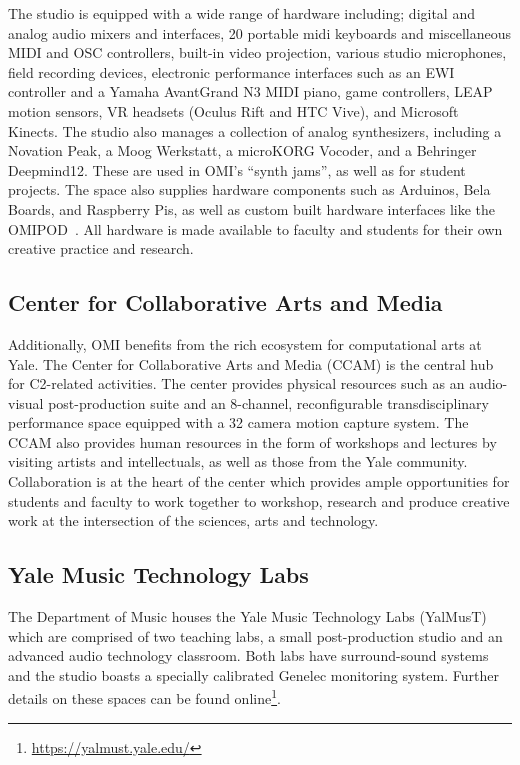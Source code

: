 The studio is equipped with a wide range of hardware including; digital and analog audio mixers and interfaces, 20 portable midi keyboards and miscellaneous MIDI and OSC controllers, built-in video projection, various studio microphones, field recording devices, electronic performance interfaces such as an EWI controller and a Yamaha AvantGrand N3 MIDI piano, game controllers, LEAP motion sensors, VR headsets (Oculus Rift and HTC Vive), and Microsoft Kinects. The studio also manages a collection of analog synthesizers, including a Novation Peak, a Moog Werkstatt, a microKORG Vocoder, and a Behringer Deepmind12. These are used in OMI's ``synth jams'', as well as for student projects. The space also supplies hardware components such as Arduinos, Bela Boards, and Raspberry Pis, as well as custom built hardware interfaces like the OMIPOD~\cite{omipod}. All hardware is made available to faculty and students for their own creative practice and research. 

\subsection{Center for Collaborative Arts and Media}

Additionally, OMI benefits from the rich ecosystem for computational arts at Yale. The Center for Collaborative Arts and Media (CCAM) is the central hub for C2-related activities. The center provides physical resources such as an audio-visual post-production suite and an 8-channel, reconfigurable transdisciplinary performance space equipped with a 32 camera motion capture system. The CCAM also provides human resources in the form of workshops and lectures by visiting artists and intellectuals, as well as those from the Yale community. Collaboration is at the heart of the center which provides ample opportunities for students and faculty to work together to workshop, research and produce creative work at the intersection of the sciences, arts and technology.

\subsection{Yale Music Technology Labs}

The Department of Music houses the Yale Music Technology Labs (YalMusT) which are comprised of two teaching labs, a small post-production studio and an advanced audio technology classroom. Both labs have surround-sound systems and the studio boasts a specially calibrated Genelec monitoring system. Further details on these spaces can be found online\footnote{\url{https://yalmust.yale.edu/}}.

